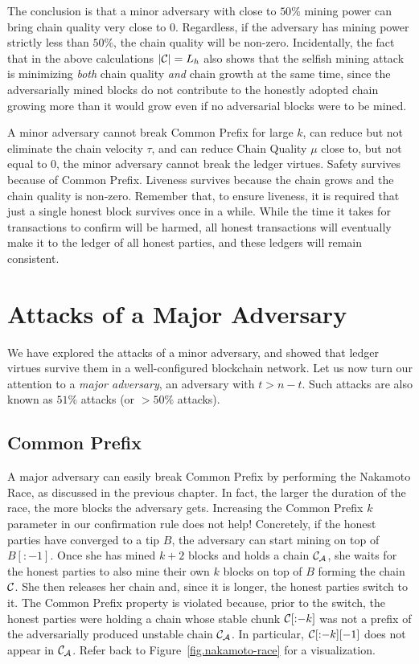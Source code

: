The conclusion is that a minor adversary with close to $50\%$ mining power can bring
chain quality very close to $0$. Regardless, if the adversary has mining power strictly
less than $50\%$, the chain quality will be non-zero.
Incidentally, the fact that in the above calculations
$|\mathcal{C}| = L_h$ also shows that the selfish mining attack is minimizing \emph{both}
chain quality \emph{and} chain growth at the same time, since the adversarially mined
blocks do not contribute to the honestly adopted chain growing more than it would
grow even if no adversarial blocks were to be mined.

A minor adversary cannot break Common Prefix for large $k$, can reduce but not eliminate the chain velocity
$\tau$, and can reduce Chain Quality $\mu$ close to, but not equal to $0$, the minor adversary cannot
break the ledger virtues. Safety survives because of Common Prefix. Liveness survives because the chain grows
and the chain quality is non-zero. Remember that, to ensure liveness, it is required that just a single honest
block survives once in a while. While the time it takes for transactions to confirm will be harmed, all honest
transactions will eventually make it to the ledger of all honest parties, and these ledgers will remain
consistent.

\section{Attacks of a Major Adversary}
We have explored the attacks of a minor adversary, and showed that ledger virtues survive them in a
well-configured blockchain network. Let us now turn our attention to a \emph{major adversary}, an
adversary with $t > n - t$. Such attacks are also known as $51\%$ attacks (or $> 50\%$ attacks).

\subsection*{Common Prefix}
A major adversary can easily break Common Prefix by performing the Nakamoto Race, as discussed
in the previous chapter. In fact, the larger the duration of the race, the more blocks the adversary
gets. Increasing the Common Prefix $k$ parameter in our confirmation rule does not help!
Concretely,
if the honest parties have converged to a tip $B$, the adversary can start mining on top of
$B[{:}{-1}]$. Once she has mined $k + 2$ blocks and holds a chain $\mathcal{C}_\mathcal{A}$,
she waits for the honest parties to also mine their own $k$ blocks on top of $B$
forming the chain $\mathcal{C}$.
She then releases her chain and, since it is longer, the honest parties switch to it.
The Common Prefix property is violated because, prior to the switch, the honest parties
were holding a chain whose stable chunk $\mathcal{C}[{:}{-k}]$ was not a prefix of the
adversarially produced unstable chain $\mathcal{C}_\mathcal{A}$. In particular,
$\mathcal{C}[{:}{-k}][-1]$ does not appear in $\mathcal{C}_\mathcal{A}$. Refer back to
Figure~\ref{fig.nakamoto-race}
for a visualization.

